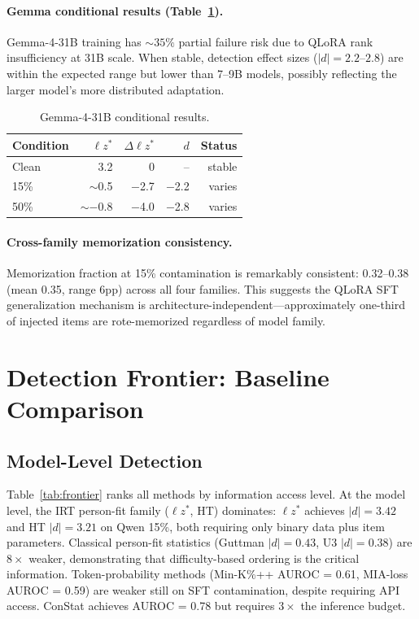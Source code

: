 \documentclass[11pt,twocolumn]{article}
\newcommand{\lzs}{\ensuremath{\ell z^*}}
\begin{document}
\paragraph{Gemma conditional results (Table~\ref{tab:gemma}).} Gemma-4-31B training has ${\sim}35\%$ partial failure risk due to QLoRA rank insufficiency at 31B scale. When stable, detection effect sizes ($|d| = 2.2$--$2.8$) are within the expected range but lower than 7--9B models, possibly reflecting the larger model's more distributed adaptation.

\begin{table}[t]
\centering
\caption{Gemma-4-31B conditional results.}
\label{tab:gemma}
\footnotesize
\begin{tabular}{lrrrr}
\toprule
Condition & $\lzs$ & $\Delta\lzs$ & $d$ & Status \\
\midrule
Clean & 3.2 & 0 & -- & stable \\
15\% & $\sim$0.5 & $-$2.7 & $-$2.2 & varies \\
50\% & $\sim-$0.8 & $-$4.0 & $-$2.8 & varies \\
\bottomrule
\end{tabular}
\vspace{-0.3cm}
\end{table}

\paragraph{Cross-family memorization consistency.} Memorization fraction at 15\% contamination is remarkably consistent: 0.32--0.38 (mean 0.35, range 6pp) across all four families. This suggests the QLoRA SFT generalization mechanism is architecture-independent---approximately one-third of injected items are rote-memorized regardless of model family.

\section{Detection Frontier: Baseline Comparison}

\subsection{Model-Level Detection}

Table~\ref{tab:frontier} ranks all methods by information access level. At the model level, the IRT person-fit family ($\lzs$, HT) dominates: $\lzs$ achieves $|d| = 3.42$ and HT $|d| = 3.21$ on Qwen 15\%, both requiring only binary data plus item parameters. Classical person-fit statistics (Guttman $|d| = 0.43$, U3 $|d| = 0.38$) are $8\times$ weaker, demonstrating that difficulty-based ordering is the critical information. Token-probability methods (Min-K\%++ AUROC = 0.61, MIA-loss AUROC = 0.59) are weaker still on SFT contamination, despite requiring API access. ConStat achieves AUROC = 0.78 but requires $3\times$ the inference budget.
\end{document}
